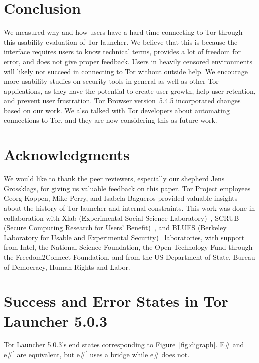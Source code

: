 \documentclass[USenglish,oneside,twocolumn]{article}
\begin{document}
\section{Conclusion} 
\label{sec:conclusion}
We measured why and how users have a hard time connecting to Tor through this usability evaluation of Tor launcher. We believe that this is because the interface requires users to know technical terms, provides a lot of freedom for error, and does not give proper feedback. Users in heavily censored environments will likely not succeed in connecting to Tor without outside help. We encourage more usability studies on security tools in general as well as other Tor applications, as they have the potential to create user growth, help user retention, and prevent user frustration. Tor Browser version~5.4.5 incorporated  changes based on our work. We also talked with Tor developers about automating connections to Tor, and they are now considering this as future work. 

\section {Acknowledgments}
We would like to thank the peer reviewers, especially our shepherd Jens Grossklags, for giving us valuable feedback on this paper. Tor Project employees Georg Koppen, Mike Perry, and Isabela Bagueros provided valuable insights about the history of Tor launcher and internal constraints. This work was done in collaboration with Xlab (Experimental Social Science Laboratory)~\cite{xlab}, SCRUB (Secure Computing Research for Users' Benefit)~\cite{scrub}, and BLUES (Berkeley Laboratory for Usable and Experimental Security)~\cite{blues} laboratories, with support from
Intel, the National Science Foundation,
the Open Technology Fund through the Freedom2Connect Foundation, and from
the US Department of State, Bureau of Democracy, Human Rights and Labor.




\appendix

\section{Success and Error States in Tor Launcher 5.0.3} 
\label{states} 
Tor Launcher 5.0.3's end states corresponding to Figure~\ref{fig:digraph}. E\# and $\mbox{e\#}^\prime$ are equivalent, but $\mbox{e\#}^\prime$ uses a bridge while e\# does not. \\
\end{document}
